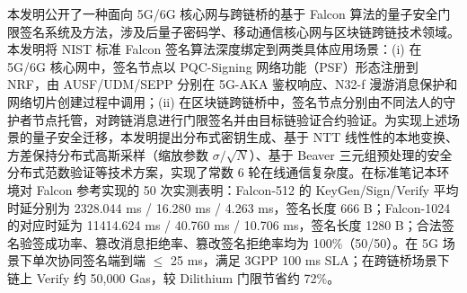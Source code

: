 \documentclass[12pt,a4paper]{article}
\begin{document}
本发明公开了一种面向 5G/6G 核心网与跨链桥的基于 Falcon 算法的量子安全门限签名系统及方法，涉及后量子密码学、移动通信核心网与区块链跨链技术领域。本发明将 NIST 标准 Falcon 签名算法深度绑定到两类具体应用场景：(i) 在 5G/6G 核心网中，签名节点以 PQC-Signing 网络功能（PSF）形态注册到 NRF，由 AUSF/UDM/SEPP 分别在 5G-AKA 鉴权响应、N32-f 漫游消息保护和网络切片创建过程中调用；(ii) 在区块链跨链桥中，签名节点分别由不同法人的守护者节点托管，对跨链消息进行门限签名并由目标链验证合约验证。为实现上述场景的量子安全迁移，本发明提出分布式密钥生成、基于 NTT 线性性的本地变换、方差保持分布式高斯采样（缩放参数 $\sigma/\sqrt{N}$）、基于 Beaver 三元组预处理的安全分布式范数验证等技术方案，实现了常数 6 轮在线通信复杂度。在标准笔记本环境对 Falcon 参考实现的 50 次实测表明：Falcon-512 的 KeyGen/Sign/Verify 平均时延分别为 2328.044 ms / 16.280 ms / 4.263 ms，签名长度 666 B；Falcon-1024 的对应时延为 11414.624 ms / 40.760 ms / 10.706 ms，签名长度 1280 B；合法签名验签成功率、篡改消息拒绝率、篡改签名拒绝率均为 100\%（50/50）。在 5G 场景下单次协同签名端到端 $\le$ 25 ms，满足 3GPP 100 ms SLA；在跨链桥场景下链上 Verify 约 50,000 Gas，较 Dilithium 门限节省约 72\%。
\end{document}
